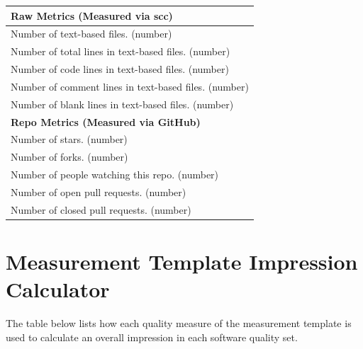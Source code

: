 \documentclass[letterpaper,cleveref]{lipics-v2019}
\begin{document}
\def\arraystretch{1.4}
\begin{tabular}{p{14cm}}
		\hline		
	\textbf{Raw Metrics (Measured via scc)}\\
	\hline
	Number of text-based files. (number)\\
	Number of total lines in text-based files. (number)\\
	Number of code lines in text-based files. (number)\\
	Number of comment lines in text-based files. (number)\\
	Number of blank lines in text-based files. (number)\\
	\hline
	\textbf{Repo Metrics (Measured via GitHub)}\\
	\hline
	Number of stars. (number)\\
	Number of forks. (number)\\
	Number of people watching this repo. (number)\\
	Number of open pull requests. (number)\\
	Number of closed pull requests. (number)\\
	\hline
\end{tabular}

\newpage

\section{Measurement Template Impression Calculator} \label{SecImpressionCalculator}

The table below lists how each quality measure of the measurement template is
used to calculate an overall impression in each software quality set.

\newpage
\end{document}
